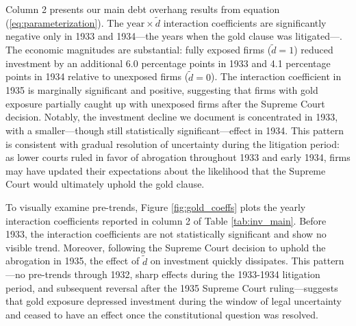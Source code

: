 Column 2 presents our main debt overhang results from equation (\ref{eq:parameterization}). The $\text{year}\times\tilde{d}$ interaction coefficients are significantly negative only in 1933 and 1934---the years when the gold clause was litigated---. The economic magnitudes are substantial: fully exposed firms ($\tilde{d}=1$) reduced investment by an additional 6.0 percentage points in 1933 and 4.1 percentage points in 1934 relative to unexposed firms ($\tilde{d}=0$). The interaction coefficient in 1935 is marginally significant and positive, suggesting that firms with gold exposure partially caught up with unexposed firms after the Supreme Court decision. Notably, the investment decline we document is concentrated in 1933, with a smaller---though still statistically significant---effect in 1934. This pattern is consistent with gradual resolution of uncertainty during the litigation period: as lower courts ruled in favor of abrogation throughout 1933 and early 1934, firms may have updated their expectations about the likelihood that the Supreme Court would ultimately uphold the gold clause.

To visually examine pre-trends, Figure \ref{fig:gold_coeffs} plots the yearly interaction coefficients reported in column 2 of Table \ref{tab:inv_main}. Before 1933, the interaction coefficients are not statistically significant and show no visible trend. Moreover, following the Supreme Court decision to uphold the abrogation in 1935, the effect of $\tilde{d}$ on investment quickly dissipates. This pattern---no pre-trends through 1932, sharp effects during the 1933-1934 litigation period, and subsequent reversal after the 1935 Supreme Court ruling---suggests that gold exposure depressed investment during the window of legal uncertainty and ceased to have an effect once the constitutional question was resolved. 

